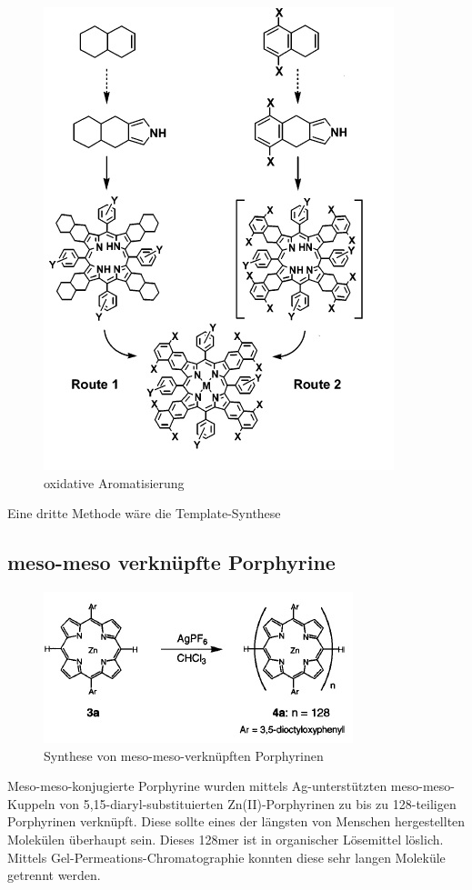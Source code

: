 \begin{figure}[!htbp]
\centering
\includegraphics[scale=0.5]{graphics/oxidative_Aromatisierung}
\caption{oxidative Aromatisierung}
\end{figure}
Eine dritte Methode wäre die Template-Synthese
\subsection{meso-meso verknüpfte Porphyrine}
\begin{figure}[!htbp]
\centering
\includegraphics[scale=1]{graphics/meso-meso-fused}
\caption{Synthese von meso-meso-verknüpften Porphyrinen}
\end{figure}
Meso-meso-konjugierte Porphyrine wurden mittels Ag-unterstützten meso-meso-Kuppeln von 5,15-diaryl-substituierten Zn(II)-Porphyrinen zu bis zu 128-teiligen Porphyrinen verknüpft. Diese sollte eines der längsten von Menschen hergestellten Molekülen überhaupt sein. Dieses 128mer ist in organischer Lösemittel löslich. Mittels Gel-Permeations-Chromatographie konnten diese sehr langen Moleküle getrennt werden.
\cite{[11]}
